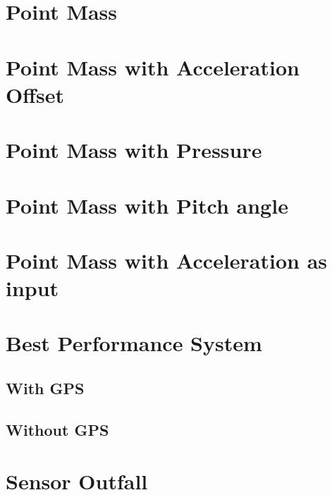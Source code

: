 \section{Point Mass}

\section{Point Mass with Acceleration Offset}

\section{Point Mass with Pressure}

\section{Point Mass with Pitch angle}

\section{Point Mass with Acceleration as input}

\section{Best Performance System}


\subsection{With GPS}
\subsection{Without GPS}
\section{Sensor Outfall}